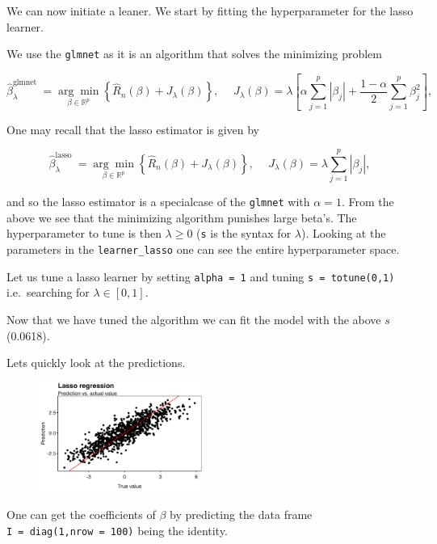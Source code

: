 \documentclass[a4paper,12pt,openany]{book}
\begin{document}
We can now initiate a leaner. We start by fitting the hyperparameter for the lasso learner.

We use the \texttt{glmnet} as it is an algorithm that solves the minimizing problem

\[
\hat{\beta}_\lambda^{\text {glmnet }} =\underset{\beta \in \mathbb{R}^p}{\arg \min }\left\{\hat{R}_n(\beta)+J_\lambda(\beta)\right\},\hspace{15pt}J_\lambda(\beta)=\lambda \left[\alpha\sum_{j=1}^p\left|\beta_j\right|+\frac{1-\alpha}{2}\sum_{j=1}^p\beta_j^2\right],
\]

One may recall that the lasso estimator is given by

\[
\hat{\beta}_\lambda^{\text {lasso }} =\underset{\beta \in \mathbb{R}^p}{\arg \min }\left\{\hat{R}_n(\beta)+J_\lambda(\beta)\right\},\hspace{15pt}J_\lambda(\beta)=\lambda \sum_{j=1}^p\left|\beta_j\right|,
\]

and so the lasso estimator is a specialcase of the \texttt{glmnet} with \(\alpha=1\). From the above we see that the minimizing algorithm punishes large beta's. The hyperparameter to tune is then \(\lambda\ge 0\) (\texttt{s} is the syntax for \(\lambda\)). Looking at the parameters in the \texttt{learner\_lasso} one can see the entire hyperparameter space.

Let us tune a lasso learner by setting \texttt{alpha\ =\ 1} and tuning \texttt{s\ =\ totune(0,1)} i.e.~searching for \(\lambda \in [0,1]\).

Now that we have tuned the algorithm we can fit the model with the above \(s\) (0.0618).

Lets quickly look at the predictions.

\begin{figure}[H]
  \begin{center}
    \includegraphics[width=0.48\textwidth]{figures/ML_week2_ex1_02.png}
  \end{center}
\end{figure}

One can get the coefficients of \(\beta\) by predicting the data frame \texttt{I\ =\ diag(1,nrow\ =\ 100)} being the identity.
\end{document}
